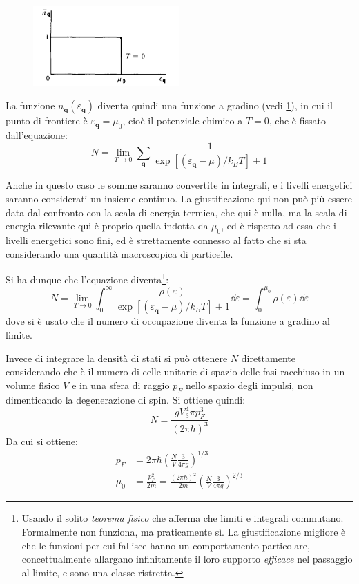 \begin{figure}[t]
	\centering
	\includegraphics[width=0.5\textwidth]{Immagini/FermiStep.png}
	\caption{}
	\label{fig:fermistep}
\end{figure}

La funzione $n_{\textbf{q}} (\varepsilon_{\textbf{q}})$ diventa quindi una funzione a gradino (vedi \cref{fig:fermistep}), in cui il punto di frontiere è $\varepsilon_{\textbf{q}} = \mu_0$, cioè il potenziale chimico a $T=0$, che è fissato dall'equazione:
\begin{equation*}
N = \lim_{T\rightarrow 0} \sum_{\textbf{q}} \frac{1}{\exp\left[(\varepsilon_{\textbf{q}} - \mu)/k_B T\right] + 1}
\end{equation*}

Anche in questo caso le somme saranno convertite in integrali, e i livelli energetici saranno considerati un insieme continuo. La giustificazione qui non può più essere data dal confronto con la scala di energia termica, che qui è nulla, ma la scala di energia rilevante qui è proprio quella indotta da $\mu_0$, ed è rispetto ad essa che i livelli energetici sono fini, ed è strettamente connesso al fatto che si sta considerando una quantità macroscopica di particelle.

Si ha dunque che l'equazione diventa\footnote{Usando il solito \textit{teorema fisico} che afferma che limiti e integrali commutano. Formalmente non funziona, ma praticamente sì. La giustificazione migliore è che le funzioni per cui fallisce hanno un comportamento particolare, concettualmente allargano infinitamente il loro supporto \textit{efficace} nel passaggio al limite, e sono una classe ristretta.}:
\begin{equation*}
N = \lim_{T\rightarrow 0} \int_{0}^{\infty} \frac{\rho(\varepsilon)}{\exp\left[(\varepsilon_{\textbf{q}} - \mu)/k_B T\right] + 1} \dd \varepsilon = \int_{0}^{\mu_0} \rho(\varepsilon) \dd \varepsilon
\end{equation*}
dove si è usato che il numero di occupazione diventa la funzione a gradino al limite.

Invece di integrare la densità di stati si può ottenere $N$ direttamente considerando che è il numero di celle unitarie di spazio delle fasi racchiuso in un volume fisico $V$ e in una sfera di raggio $p_F$ nello spazio degli impulsi, non dimenticando la degenerazione di spin. Si ottiene quindi:
\begin{equation*}
N = \frac{gV \frac{4}{3} \pi p_F^3}{(2\pi \hbar)^3}
\end{equation*}
Da cui si ottiene:
\begin{align*}
p_F &= 2\pi \hbar \left(\frac{N}{V} \frac{3}{4\pi g}\right)^{1/3}\\
\mu_0 &= \frac{p_F^2}{2m} = \frac{(2\pi \hbar)^2}{2m} \left(\frac{N}{V} \frac{3}{4\pi g}\right)^{2/3}
\end{align*}

